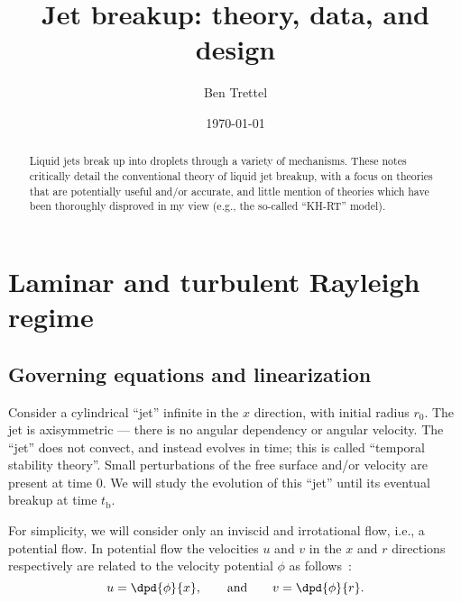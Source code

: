 \documentclass[ccbysa,note]{bmtreport}
\title{Jet breakup: theory, data, and design}
\author{Ben Trettel}
\date{\today} %
\begin{document}
\maketitle
\begin{abstract}
Liquid jets break up into droplets through a variety of mechanisms. These notes critically detail the conventional theory of liquid jet breakup, with a focus on theories that are potentially useful and/or accurate, and little mention of theories which have been thoroughly disproved in my view (e.g., the so-called ``KH-RT'' model).
\end{abstract}

\section{Laminar and turbulent Rayleigh regime}


\subsection{Governing equations and linearization}

Consider a cylindrical ``jet'' infinite in the $x$ direction, with initial radius $r_0$. The jet is axisymmetric --- there is no angular dependency or angular velocity. The ``jet'' does not convect, and instead evolves in time; this is called ``temporal stability theory''. Small perturbations of the free surface and/or velocity are present at time $0$. We will study the evolution of this ``jet'' until its eventual breakup at time $t_\text{b}$.

For simplicity, we will consider only an inviscid and irrotational flow, i.e., a potential flow. In potential flow the velocities $u$ and $v$ in the $x$ and $r$ directions respectively are related to the velocity potential $\phi$ as follows~\citep[p.~283]{panton_incompressible_2013}:
\begin{equation}
   u = \dpd{\phi}{x}, \qquad \text{and} \qquad v = \dpd{\phi}{r}.
\end{equation}
\end{document}
